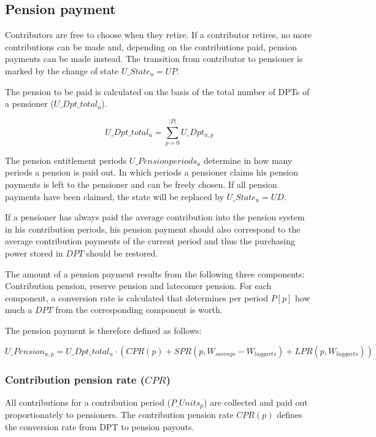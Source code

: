 \subsection{Pension payment}

Contributors are free to choose when they retire. If a contributor retires, no more contributions can be made and, depending on the contributions paid, pension payments can be made instead. The transition from contributor to pensioner is marked by the change of state $U\_State_{u} = UP$.

The pension to be paid is calculated on the basis of the total number of DPTs of a pensioner ($U\_Dpt\_total_{u}$).

\begin{equation}
U\_Dpt\_total_{u} = \sum_{p=0}^{|P|} U\_Dpt_{u,p}
\end{equation}

The pension entitlement periods $U\_Pensionperiods_{u}$ determine in how many periods a pension is paid out. In which periods a pensioner claims his pension payments is left to the pensioner and can be freely chosen. If all pension payments have been claimed, the state will be replaced by $U\_State_{u} = UD$.

If a pensioner has always paid the average contribution into the pension system in his contribution periods, his pension payment should also correspond to the average contribution payments of the current period and thus the purchasing power stored in $DPT$ should be restored.

The amount of a pension payment results from the following three components: Contribution pension, reserve pension and latecomer pension. For each component, a conversion rate is calculated that determines per period $P[p]$ how much a $DPT$ from the corresponding component is worth.

The pension payment is therefore defined as follows:

\begin{dmath}
U\_Pension_{u,p} = U\_Dpt\_total_{u} \cdot (CPR(p) + SPR(p, W_{savings} - W_{laggarts}) + LPR(p, W_{laggarts}))
\end{dmath}

\subsubsection{Contribution pension rate ($CPR$)}
All contributions for a contribution period ($P\_Units_{p}$) are collected and paid out proportionately to pensioners. The contribution pension rate $CPR(p)$ defines the conversion rate from DPT to pension payouts.

